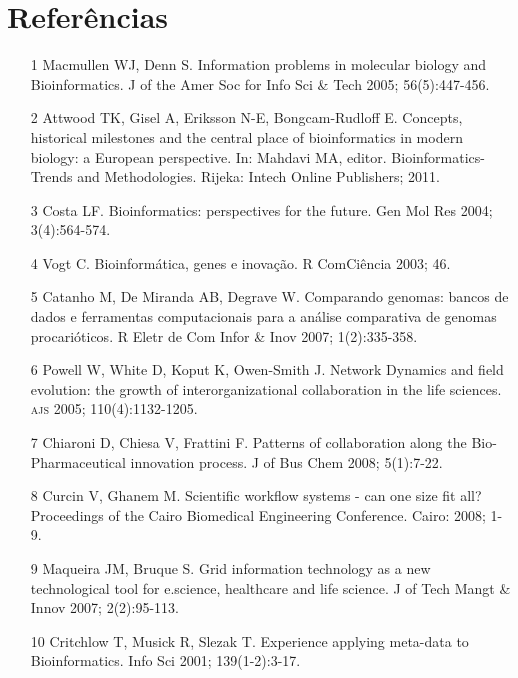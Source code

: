 \documentclass{article}
\begin{document}
\section*{Referências}
\begin{itemize}

\item[1] Macmullen WJ, Denn S. Information problems in molecular biology and
Bioinformatics. J of the Amer Soc for Info Sci \& Tech 2005; 56(5):447-456.

\item[2] Attwood TK, Gisel A, Eriksson N-E, Bongcam-Rudloff E. Concepts,
historical milestones and the central place of bioinformatics in modern biology:
a European perspective. In: Mahdavi MA, editor. Bioinformatics-Trends and
Methodologies. Rijeka: Intech Online Publishers; 2011.

\item[3] Costa LF. Bioinformatics: perspectives for the future. Gen Mol Res
2004; 3(4):564-574.

\item[4] Vogt C. Bioinformática, genes e inovação. R ComCiência 2003; 46.

\item[5] Catanho M, De Miranda AB, Degrave W. Comparando genomas: bancos de
dados e ferramentas computacionais para a análise comparativa de genomas
procarióticos. R Eletr de Com Infor \& Inov 2007; 1(2):335-358.

\item[6] Powell W, White D, Koput K, Owen-Smith J. Network Dynamics and field
evolution: the growth of interorganizational collaboration in the life sciences.
\textsc{ajs} 2005; 110(4):1132-1205.

\item[7] Chiaroni D, Chiesa V, Frattini F. Patterns of collaboration along
the Bio-Pharmaceutical innovation process. J of Bus Chem 2008; 5(1):7-22.

\item[8] Curcin V, Ghanem M. Scientific workflow systems - can one size fit
all? Proceedings of the Cairo Biomedical Engineering Conference. Cairo: 2008;
1-9.

\item[9] Maqueira JM, Bruque S. Grid information technology as a new
technological tool for e.science, healthcare and life science. J of Tech Mangt
\& Innov 2007; 2(2):95-113.

\item[10] Critchlow T, Musick R, Slezak T. Experience applying meta-data to
Bioinformatics. Info Sci 2001; 139(1-2):3-17.


\end{itemize}
\end{document}
